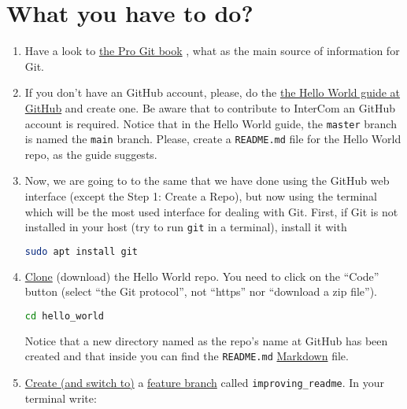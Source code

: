 \section{What you have to do?}

\begin{enumerate}
  
\item Have a look to \href{https://git-scm.com/book/en/v2}{the Pro Git
  book} \cite{Git-book}, what as the main source of information for
  Git.

\item If you don't have an GitHub account, please, do the
  \href{https://guides.github.com/activities/hello-world/}{the Hello
    World guide at GitHub} and create one. Be aware that to contribute
  to InterCom an GitHub account is required. Notice that in the Hello
  World guide, the \texttt{master} branch is named the \texttt{main}
  branch. Please, create a \texttt{README.md} file for the Hello World
  repo, as the guide suggests.

\item Now, we are going to to the same that we have done using the
  GitHub web interface (except the Step 1: Create a Repo), but now
  using the terminal which will be the most used interface for dealing
  with Git. First, if Git is not installed in your host (try to run
  \texttt{git} in a terminal), install it with
  \begin{lstlisting}[language=bash]
    sudo apt install git
  \end{lstlisting}

\item
  \href{https://docs.github.com/en/github/getting-started-with-github/github-glossary#clone}{Clone}
  (download) the Hello World repo. You need to click on the ``Code''
  button (select ``the Git protocol'', not ``https'' nor ``download a
  zip file'').

  \begin{lstlisting}[language=bash]
    cd hello_world
  \end{lstlisting}

  Notice that a new directory named as the repo's name at
  GitHub has been created and that inside you can find the
  \texttt{README.md}
  \href{https://daringfireball.net/projects/markdown/}{Markdown} file.

\item \href{https://docs.github.com/en/github/getting-started-with-github/github-glossary#checkout}{Create (and switch to)} a
  \href{https://docs.github.com/en/github/getting-started-with-github/github-glossary#feature-branch}{feature
    branch} called \texttt{improving\_readme}. In your terminal write:
  

\end{enumerate}
